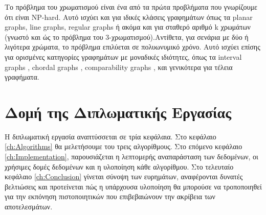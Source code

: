 Το πρόβλημα του χρωματισμού είναι ένα από τα πρώτα προβλήματα που γνωρίζουμε ότι είναι NP-hard\cite{garey-johnson-np-completeness}. Αυτό ισχύει και για ιδικές κλάσεις γραφημάτων όπως τα planar graphs\cite{garey-johnson-stockmeyer-simplified-np}, line graphs\cite{holyer-np-completeness-edge-coloring}, regular graphs\cite{dailey-uniqueness-colorability-np-complete} ή ακόμα και για σταθερό αριθμό k χρωμάτων (γνωστό και ώς το πρόβλημα του 3-χρωματισμού)\cite{garey-johnson-stockmeyer-simplified-np}.Αντίθετα, για σενάρια με δύο ή λιγότερα χρώματα, το πρόβλημα επιλύεται σε πολυωνυμικό χρόνο. Αυτό ισχύει επίσης για ορισμένες κατηγορίες γραφημάτων με μοναδικές ιδιότητες, όπως τα interval graphs
\cite{golumbic-algorithmic-graph-theory-perfect-graphs}, chordal graphs \cite{golumbic-algorithmic-graph-theory-perfect-graphs}, comparability graphs \cite{golumbic-algorithmic-graph-theory-perfect-graphs}, και γενικότερα για τέλεια
γραφήματα\cite{grotschel-lovasz-schrijver-ellipsoid-method}. 



\section{Δομή της Διπλωματικής Εργασίας}
\label{sec:Structure}
Η διπλωματική εργασία αναπτύσσεται σε τρία κεφάλαια. Στο κεφάλαιο \ref{ch:Algorithms} θα μελετήσουμε του τρεις αλγορίθμους. Στο επόμενο κεφάλαιο \ref{ch:Implementation}, παρουσιάζεται η λεπτομερής αναπαράσταση των δεδομένων, οι χρήσιμες δομές δεδομένων και η υλοποίηση κάθε αλγορίθμου. Στο τελευταίο κεφάλαιο \ref{ch:Conclusion} γίνεται σύνοψη των ευρημάτων, αναφέρονται δυνατές βελτιώσεις και προτείνεται πώς η υπάρχουσα υλοποίηση θα μπορούσε να τροποποιηθεί για την εκπόνηση πιστοποιητικών που επιβεβαιώνουν την ακρίβεια των αποτελεσμάτων.